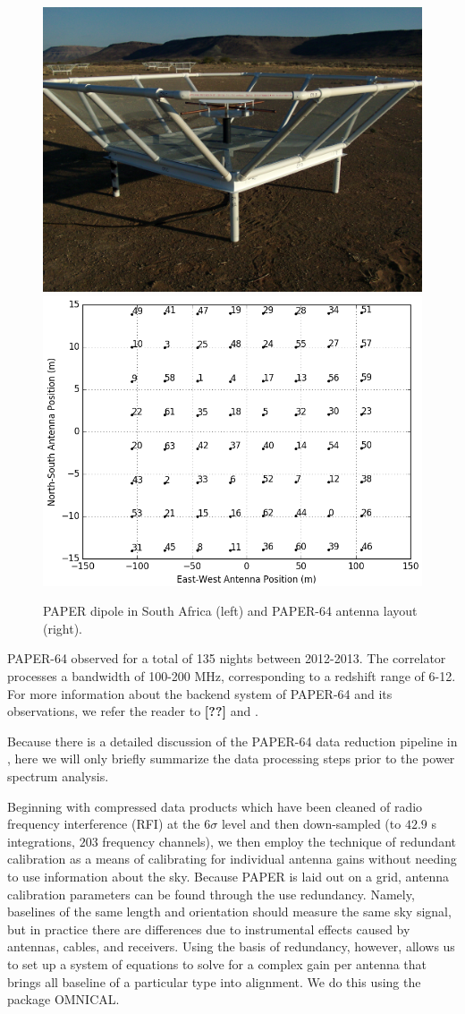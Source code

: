\documentclass[preprint2,numberedappendix,tighten,twocolappendix]{aastex6}  %
\newcommand{\cc}[1]{{\color{purple} \textbf{[#1]}}}
\begin{document}
\begin{figure}
	\centering
	\includegraphics[height=0.35\textwidth]{plots/paper_dipole.png}
	\includegraphics[height=0.35\textwidth]{plots/antenna_layout.png}
	\caption{PAPER dipole in South Africa (left) and PAPER-64 antenna layout (right).}
	\label{fig:paper}
\end{figure}

PAPER-64 observed for a total of 135 nights between 2012-2013. The correlator processes a bandwidth of 100-200 MHz, corresponding to a redshift range of 6-12. For more information about the backend system of PAPER-64 and its observations, we refer the reader to \cc{??} and \citet{ali_et_al2015}.

Because there is a detailed discussion of the PAPER-64 data reduction pipeline in \citet{ali_et_al2015}, here we will only briefly summarize the data processing steps prior to the power spectrum analysis. 

Beginning with compressed data products which have been cleaned of radio frequency interference (RFI) at the $6\sigma$ level and then down-sampled (to $42.9$ s integrations, $203$ frequency channels), we then employ the technique of redundant calibration as a means of calibrating for individual antenna gains without needing to use information about the sky. Because PAPER is laid out on a grid, antenna calibration parameters can be found through the use redundancy. Namely, baselines of the same length and orientation should measure the same sky signal, but in practice there are differences due to instrumental effects caused by antennas, cables, and receivers. Using the basis of redundancy, however, allows us to set up a system of equations to solve for a complex gain per antenna that brings all baseline of a particular type into alignment. We do this using the package OMNICAL.
\end{document}
